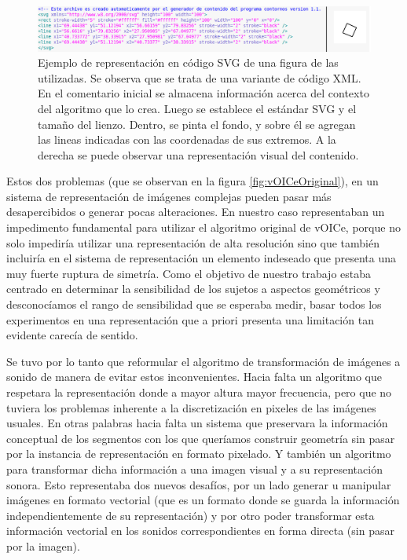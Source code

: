 \documentclass{article}
\begin{document}
    \begin{figure}
        \center
        \includegraphics[width=\textwidth]{Imagenes/678SVG.png}
        \caption{Ejemplo de representación en código SVG de una figura de las utilizadas. Se observa que se trata de una variante de código XML. En el comentario inicial se almacena información acerca del contexto del algoritmo que lo crea. Luego se establece el estándar SVG y el tamaño del lienzo. Dentro, se pinta el fondo, y sobre él se agregan las lineas indicadas con las coordenadas de sus extremos. A la derecha se puede observar una representación visual del contenido.}
        \label{fig:SVGtoPNG}
    \end{figure}
    
    Estos dos problemas (que se observan en la figura \ref{fig:vOICeOriginal}), en un sistema de representación de imágenes complejas pueden pasar más desapercibidos o generar pocas alteraciones. En nuestro caso representaban un impedimento fundamental para utilizar el algoritmo original de vOICe, porque no solo impediría utilizar una representación de alta resolución sino que también incluiría en el sistema de representación un elemento indeseado que presenta una muy fuerte ruptura de simetría. Como el objetivo de nuestro trabajo estaba centrado en determinar la sensibilidad de los sujetos a aspectos geométricos y desconocíamos el rango de sensibilidad que se esperaba medir, basar todos los experimentos en una representación que a priori presenta una limitación tan evidente carecía de sentido. 
    
    Se tuvo por lo tanto que reformular el algoritmo de transformación de imágenes a sonido de manera de evitar estos inconvenientes. Hacia falta un algoritmo que respetara la representación donde a mayor altura mayor frecuencia, pero que no tuviera los problemas inherente a la discretización en pixeles de las imágenes usuales. En otras palabras hacia falta un sistema que preservara la información conceptual de los segmentos con los que queríamos construir geometría sin pasar por la instancia de representación en formato pixelado. Y también un algoritmo para transformar dicha información a una imagen visual y a su representación sonora. Esto representaba dos nuevos desafíos, por un lado generar u manipular imágenes en formato vectorial (que es un formato donde se guarda la información independientemente de su representación) y por otro poder transformar esta información vectorial en los sonidos correspondientes en forma directa (sin pasar por la imagen). 
    
\end{document}
